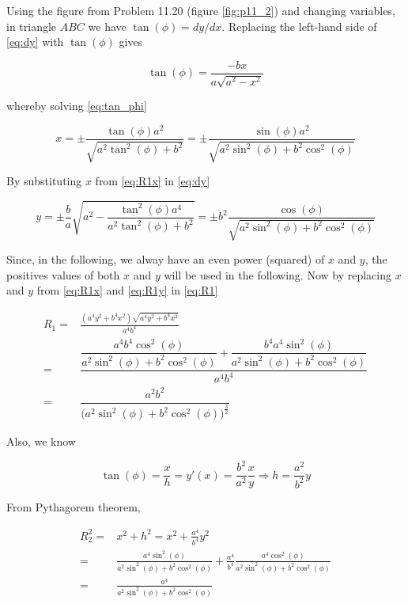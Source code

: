 \documentclass{article}
\begin{document}
Using the figure from Problem 11.20 (figure \ref{fig:p11_2}) and changing variables, in triangle $ABC$ we have $\tan(\phi) = dy/dx$. Replacing the left-hand side of \ref{eq:dy} with $\tan(\phi)$ gives 

\begin{equation}
	\tan(\phi) = \frac{-bx}{a \sqrt{a^2 - x^2}}
	\label{eq:tan_phi}
\end{equation}

whereby solving \ref{eq:tan_phi}

\begin{equation}
	x = \pm \frac{\tan(\phi) a^2}{\sqrt{a^2 \tan^2(\phi) + b^2}} = \pm \frac{\sin(\phi) a^2}{\sqrt{a^2 \sin^2(\phi) + b^2 \cos^2(\phi)}}  
	\label{eq:R1x}
\end{equation}

By substituting $x$ from \ref{eq:R1x} in \ref{eq:dy}

\begin{equation}
	y = \pm \frac{b}{a} \sqrt{a^2 - \frac{\tan^2(\phi) a^4}{a^2 \tan^2(\phi) + b^2}} = \pm b^2 \frac{\cos(\phi)}{\sqrt{a^2 \sin^2(\phi) + b^2 \cos^2(\phi)}}
	\label{eq:R1y}
\end{equation}

Since, in the following, we alway have an even power (squared) of $x$ and $y$, the positives values of both $x$ and $y$ will be used in the following. Now by replacing $x$ and $y$ from \ref{eq:R1x} and \ref{eq:R1y} in \ref{eq:R1}

\begin{equation}
\begin{aligned}
	R_1 =& \frac{(a^4 y^2 + b^4 x^2) \sqrt{a^4 y^2 + b^4 x^2}}{a^4 b^4} \\
	=& \dfrac{\dfrac{a^4 b^4 \cos^2(\phi)}{a^2 \sin^2(\phi) + b^2 \cos^2(\phi)} + \dfrac{b^4 a^4 \sin^2(\phi)}{a^2 \sin^2(\phi) + b^2 \cos^2(\phi)}}{a^4 b^4} \\
	=& \dfrac{a^2 b^2}{{(a^2 \sin^2(\phi) + b^2 \cos^2(\phi)})^\frac{3}{2}}
	\label{eq:R1_1}
\end{aligned}
\end{equation}

Also, we know

\begin{equation}
	\tan(\phi) = \frac{x}{h} = y'(x) = \frac{b^2}{a^2} \frac{x}{y} \Rightarrow h = \frac{a^2}{b^2}y
\end{equation}

From Pythagorem theorem, 

\begin{equation}
\begin{aligned}
	R_2^2 =& x^2 + h^2 = x^2 + \frac{a^4}{b^4} y^2  \\
	=& \frac{a^4 \sin^2(\phi)}{a^2 \sin^2(\phi) + b^2 \cos^2(\phi)} + \frac{a^4}{b^4} \frac{a^4 \cos^2(\phi)}{a^2 \sin^2(\phi) + b^2 \cos^2(\phi)} \\
	=& \frac{a^4}{a^2 \sin^2(\phi) + b^2 \cos^2(\phi)}
	\label{eq:R2}
\end{aligned}
\end{equation}
\end{document}
